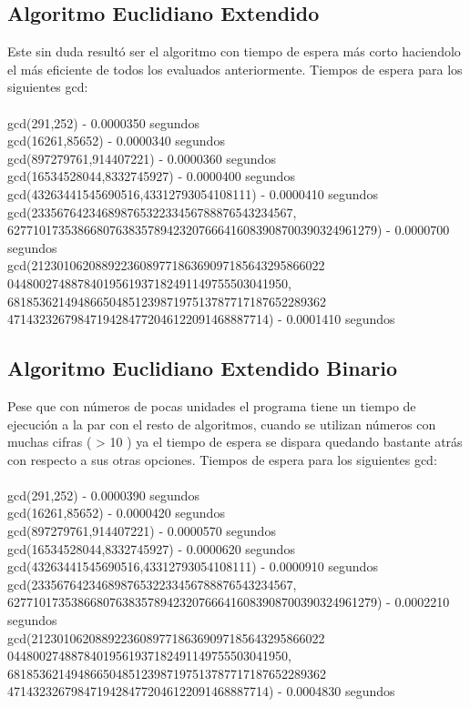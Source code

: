 \documentclass[12pt,letterpaper]{scrartcl}
\begin{document}
\subsection{Algoritmo Euclidiano Extendido}

Este sin duda resultó ser el algoritmo con tiempo de espera más corto haciendolo el más eficiente de todos los evaluados anteriormente.
Tiempos de espera para los siguientes gcd:
\\\\
gcd(291,252) - 0.0000350 segundos
\\
gcd(16261,85652) - 0.0000340 segundos
\\
gcd(897279761,914407221) - 0.0000360 segundos
\\
gcd(16534528044,8332745927) - 0.0000400 segundos
\\
gcd(43263441545690516,43312793054108111) - 0.0000410 segundos
\\
gcd(23356764234689876532233456788876543234567,\\
6277101735386680763835789423207666416083908700390324961279) - 0.0000700 segundos
\\
gcd(2123010620889223608977186369097185643295866022\\04480027488784019561937182491149755503041950,\\
68185362149486650485123987197513787717187652289362\\47143232679847194284772046122091468887714) - 0.0001410 segundos

\newpage
\subsection{Algoritmo Euclidiano Extendido Binario}

Pese que con números de pocas unidades el programa tiene un tiempo de ejecución a la par con el resto de algoritmos, cuando se utilizan números con muchas cifras ( > 10 ) ya el tiempo de espera se dispara quedando bastante atrás con respecto a sus otras opciones.
Tiempos de espera para los siguientes gcd:
\\\\
gcd(291,252) - 0.0000390 segundos
\\
gcd(16261,85652) - 0.0000420 segundos
\\
gcd(897279761,914407221) - 0.0000570 segundos
\\
gcd(16534528044,8332745927) - 0.0000620 segundos
\\
gcd(43263441545690516,43312793054108111) - 0.0000910 segundos
\\
gcd(23356764234689876532233456788876543234567,\\
6277101735386680763835789423207666416083908700390324961279) - 0.0002210 segundos
\\
gcd(2123010620889223608977186369097185643295866022\\04480027488784019561937182491149755503041950,\\
68185362149486650485123987197513787717187652289362\\47143232679847194284772046122091468887714) - 0.0004830 segundos
\end{document}
